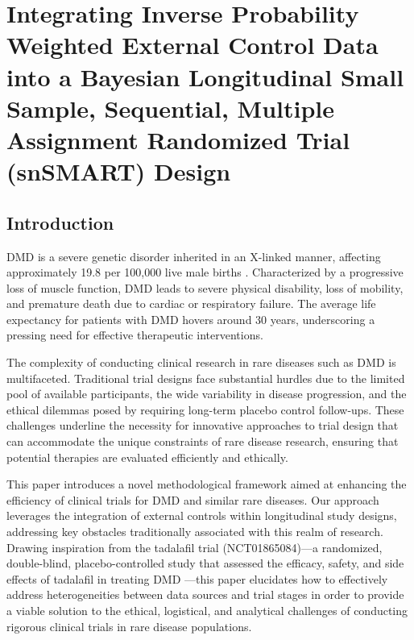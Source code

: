\chapter{Integrating Inverse Probability Weighted External Control Data into a Bayesian Longitudinal Small Sample, Sequential, Multiple Assignment Randomized Trial (snSMART) Design}
\label{chpt:longitudinal}

\section{Introduction}
\label{sec:intro}
\ac{DMD} is a severe genetic disorder inherited in an X-linked manner, affecting approximately 19.8 per 100,000 live male births \citep{crisafulli2020global}. Characterized by a progressive loss of muscle function, \ac{DMD} leads to severe physical disability, loss of mobility, and premature death due to cardiac or respiratory failure. The average life expectancy for patients with \ac{DMD} hovers around 30 years, underscoring a pressing need for effective therapeutic interventions.

The complexity of conducting clinical research in rare diseases such as \ac{DMD} is multifaceted. Traditional trial designs face substantial hurdles due to the limited pool of available participants, the wide variability in disease progression, and the ethical dilemmas posed by requiring long-term placebo control follow-ups. These challenges underline the necessity for innovative approaches to trial design that can accommodate the unique constraints of rare disease research, ensuring that potential therapies are evaluated efficiently and ethically.

This paper introduces a novel methodological framework aimed at enhancing the efficiency of clinical trials for \ac{DMD} and similar rare diseases. Our approach leverages the integration of external controls within longitudinal study designs, addressing key obstacles traditionally associated with this realm of research. Drawing inspiration from the tadalafil trial (NCT01865084)—a randomized, double-blind, placebo-controlled study that assessed the efficacy, safety, and side effects of tadalafil in treating \ac{DMD} —this paper elucidates how to effectively address heterogeneities between data sources and trial stages in order to provide a viable solution to the ethical, logistical, and analytical challenges of conducting rigorous clinical trials in rare disease populations.

